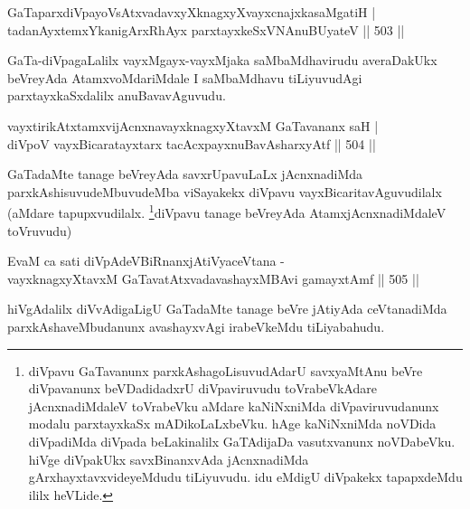 
\begin{shl}
GaTaparxdiVpayoVsAtxvadavxyXknagxyXvayxcnajxkasaMgatiH | \\
tadanAyxtemxYkanigArxRhAyx parxtayxkeSxVNAnuBUyateV \hfill||  503 ||  
\end{shl}

\begin{artha}
GaTa-diVpagaLalilx vayxMgayx-vayxMjaka saMbaMdhavirudu averaDakUkx beVreyAda AtamxvoMdariMdale I saMbaMdhavu tiLiyuvudAgi parxtayxkaSxdalilx anuBavavAguvudu.
\end{artha}

\begin{shl}
vayxtirikAtxtamxvijAcnxnavayxknagxyXtavxM GaTavananx saH | \\
diVpoV vayxBicaratayxtarx tacAcxpayxnuBavAsharxyAtf \hfill||  504 ||  
\end{shl}

\begin{artha}
GaTadaMte tanage beVreyAda savxrUpavuLaLx jAcnxnadiMda parxkAshisuvudeMbuvudeMba viSayakekx diVpavu vayxBicaritavAguvudilalx (aMdare tapupxvudilalx. \footnote{diVpavu GaTavanunx parxkAshagoLisuvudAdarU savxyaMtAnu beVre diVpavanunx beVDadidadxrU diVpaviruvudu toVrabeVkAdare jAcnxnadiMdaleV toVrabeVku aMdare kaNiNxniMda diVpaviruvudanunx modalu parxtayxkaSx mADikoLaLxbeVku. hAge kaNiNxniMda noVDida diVpadiMda diVpada beLakinalilx GaTAdijaDa vasutxvanunx noVDabeVku. hiVge diVpakUkx savxBinanxvAda jAcnxnadiMda gArxhayxtavxvideyeMdudu tiLiyuvudu. idu eMdigU diVpakekx tapapxdeMdu ililx heVLide.}diVpavu tanage beVreyAda AtamxjAcnxnadiMdaleV toVruvudu)
\end{artha}


\begin{shl}
EvaM ca sati diVpAdeVBiRnanxjAtiVyaceVtana -\\
vayxknagxyXtavxM GaTavatAtxvadavashayxMBAvi gamayxtAmf \hfill||  505 ||  
\end{shl}

\begin{artha}
hiVgAdalilx diVvAdigaLigU GaTadaMte tanage beVre jAtiyAda ceVtanadiMda parxkAshaveMbudanunx avashayxvAgi irabeVkeMdu tiLiyabahudu.
\end{artha}


